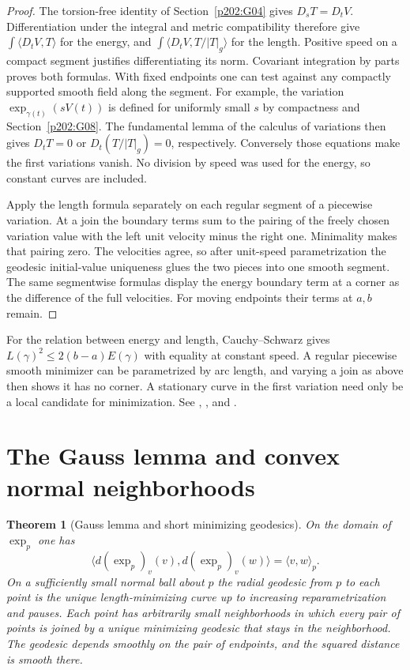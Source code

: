 \documentclass[11pt,oneside,openany]{book}
\theoremstyle{plain}
\newtheorem{theorem}{Theorem}[chapter]
\theoremstyle{definition}
\theoremstyle{remark}
\begin{document}
\begin{proof}
The torsion-free identity of Section~\ref{p202:G04} gives
\(D_sT=D_tV\). Differentiation under the integral and metric
compatibility therefore give \(\int\langle D_tV,T\rangle\)
for the energy, and \(\int\langle D_tV,T/\lvert T\rvert_g\rangle\)
for the length. Positive speed on a compact segment justifies
differentiating its norm. Covariant integration by parts proves
both formulas. With fixed endpoints one can test against any
compactly supported smooth field along the segment. For example,
the variation \(\exp_{\gamma(t)}(sV(t))\) is defined for uniformly
small \(s\) by compactness and Section~\ref{p202:G08}.
The fundamental lemma of the calculus of variations then gives
\(D_tT=0\) or \(D_t(T/\lvert T\rvert_g)=0\), respectively.
Conversely those equations make the first variations vanish.
No division by speed was used for the energy, so constant curves
are included.

Apply the length formula separately on each regular segment of a
piecewise variation. At a join the boundary terms sum to the
pairing of the freely chosen variation value with the left unit
velocity minus the right one. Minimality makes that pairing zero.
The velocities agree, so after unit-speed parametrization the
geodesic initial-value uniqueness glues the two pieces into one
smooth segment. The same segmentwise formulas display the
energy boundary term at a corner as the difference of the full
velocities. For moving endpoints their terms at \(a,b\) remain.
\end{proof}

For the relation between energy and length, Cauchy--Schwarz gives
\(L(\gamma)^2\leq 2(b-a)E(\gamma)\) with equality at constant
speed. A regular piecewise smooth minimizer can be parametrized by
arc length, and varying a join as above then shows it has no corner.
A stationary curve in the first variation need only be a local
candidate for minimization. See \cite[Chapter 6]{LeeRM},
\cite[Chapter 9, Section 2]{dC}, and \cite[Chapter 7]{P106}.

\section{The Gauss lemma and convex normal neighborhoods}
\label{p202:G09}

\begin{theorem}[Gauss lemma and short minimizing geodesics]
\label{thm:p202-gauss-normal}
On the domain of \(\exp_p\) one has
\[
 \bigl\langle d(\exp_p)_v(v),d(\exp_p)_v(w)\bigr\rangle
   =\langle v,w\rangle_p .
\]
On a sufficiently small normal ball about \(p\) the radial
geodesic from \(p\) to each point is the unique length-minimizing
curve up to increasing reparametrization and pauses.
Each point has arbitrarily small neighborhoods in which every
pair of points is joined by a unique minimizing geodesic that
stays in the neighborhood. The geodesic depends smoothly on the
pair of endpoints, and the squared distance is smooth there.
\end{theorem}
\end{document}

